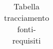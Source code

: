 \begin{table}[H]
\begin{tabular}{|p{}|p{}|}
			\bottomrule

		\end{tabular}
		\caption{Tabella tracciamento fonti-requisiti}
	\end{table}
	\newpage

